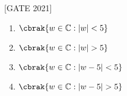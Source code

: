 \hfill{[GATE 2021]}\begin{multicols}{2}
    \begin{enumerate}
        \item $ \cbrak{  w \in \mathbb{C} : |w| < 5 } $
        \item $ \cbrak{w\in \mathbb{C} : |w| > 5 } $\item $ \cbrak{w \in \mathbb{C} : |w - 5| < 5 } $\item $ \cbrak{ w \in \mathbb{C} : |w - 5| > 5 } $
    \end{enumerate}
\end{multicols}


